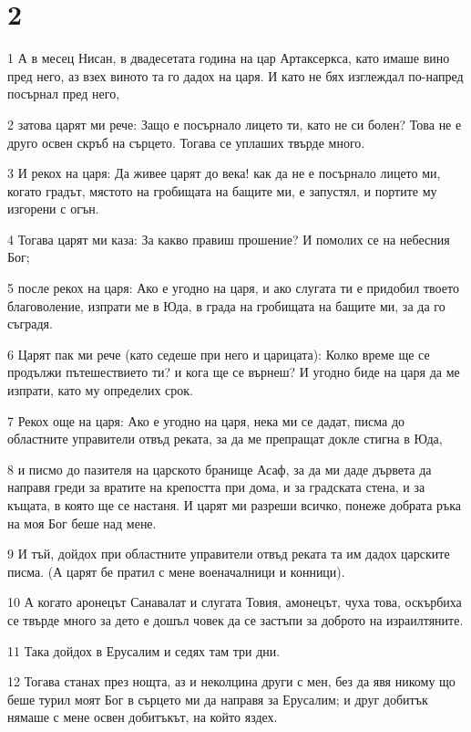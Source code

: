 \chapter{2}

\par 1 А в месец Нисан, в двадесетата година на цар Артаксеркса, като имаше вино пред него, аз взех виното та го дадох на царя. И като не бях изглеждал по-напред посърнал пред него,
\par 2 затова царят ми рече: Защо е посърнало лицето ти, като не си болен? Това не е друго освен скръб на сърцето. Тогава се уплаших твърде много.
\par 3 И рекох на царя: Да живее царят до века! как да не е посърнало лицето ми, когато градът, мястото на гробищата на бащите ми, е запустял, и портите му изгорени с огън.
\par 4 Тогава царят ми каза: За какво правиш прошение? И помолих се на небесния Бог;
\par 5 после рекох на царя: Ако е угодно на царя, и ако слугата ти е придобил твоето благоволение, изпрати ме в Юда, в града на гробищата на бащите ми, за да го съградя.
\par 6 Царят пак ми рече (като седеше при него и царицата): Колко време ще се продължи пътешествието ти? и кога ще се върнеш? И угодно биде на царя да ме изпрати, като му определих срок.
\par 7 Рекох още на царя: Ако е угодно на царя, нека ми се дадат, писма до областните управители отвъд реката, за да ме препращат докле стигна в Юда,
\par 8 и писмо до пазителя на царското бранище Асаф, за да ми даде дървета да направя греди за вратите на крепостта при дома, и за градската стена, и за къщата, в която ще се настаня. И царят ми разреши всичко, понеже добрата ръка на моя Бог беше над мене.
\par 9 И тъй, дойдох при областните управители отвъд реката та им дадох царските писма. (А царят бе пратил с мене военачалници и конници).
\par 10 А когато аронецът Санавалат и слугата Товия, амонецът, чуха това, оскърбиха се твърде много за дето е дошъл човек да се застъпи за доброто на израилтяните.
\par 11 Така дойдох в Ерусалим и седях там три дни.
\par 12 Тогава станах през нощта, аз и неколцина други с мен, без да явя никому що беше турил моят Бог в сърцето ми да направя за Ерусалим; и друг добитък нямаше с мене освен добитъкът, на който яздех.
